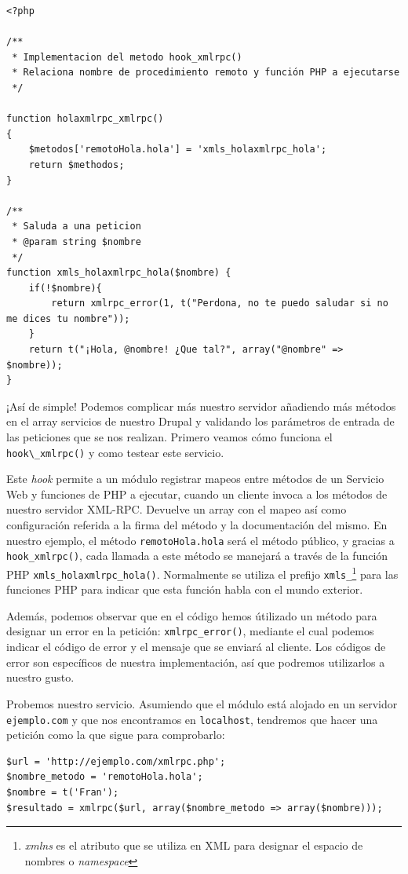 \begin{verbatim}
<?php

/**
 * Implementacion del metodo hook_xmlrpc()
 * Relaciona nombre de procedimiento remoto y función PHP a ejecutarse
 */

function holaxmlrpc_xmlrpc()
{
    $metodos['remotoHola.hola'] = 'xmls_holaxmlrpc_hola';
    return $methodos;
}

/**
 * Saluda a una peticion
 * @param string $nombre
 */
function xmls_holaxmlrpc_hola($nombre) {
    if(!$nombre){
        return xmlrpc_error(1, t("Perdona, no te puedo saludar si no me dices tu nombre"));
    }
    return t("¡Hola, @nombre! ¿Que tal?", array("@nombre" => $nombre));
}
\end{verbatim}

¡Así de simple! Podemos complicar más nuestro servidor añadiendo más métodos en el array servicios de nuestro 
Drupal y validando los parámetros de entrada de las peticiones que se nos realizan. Primero veamos cómo funciona 
el \verb|hook\_xmlrpc()| y como testear este servicio.

Este \textit{hook} permite a un módulo registrar mapeos entre métodos de un Servicio Web y funciones de PHP 
a ejecutar, cuando un cliente invoca a los métodos de nuestro servidor XML-RPC. Devuelve un array con el mapeo así 
como configuración referida a la firma del método y la documentación del mismo. En nuestro ejemplo, el método 
\verb|remotoHola.hola| será el método público, y gracias a \verb|hook_xmlrpc()|, cada llamada a este método se 
manejará a través de la función PHP \verb|xmls_holaxmlrpc_hola()|. Normalmente se utiliza el prefijo \verb|xmls_|\footnote{
\textit{xmlns} es el atributo que se utiliza en XML para designar el espacio de nombres o \textit{namespace}} para las funciones 
PHP para indicar que esta función habla con el mundo exterior.

Además, podemos observar que en el código hemos útilizado un método para designar un error en la petición: 
\verb|xmlrpc_error()|, mediante el cual podemos indicar el código de error y el mensaje que se enviará al cliente. Los 
códigos de error son específicos de nuestra implementación, así que podremos utilizarlos a nuestro gusto.

Probemos nuestro servicio. Asumiendo que el módulo está alojado en un servidor \verb|ejemplo.com| y que nos 
encontramos en \verb|localhost|, tendremos que hacer una petición como la que sigue para comprobarlo:

\begin{verbatim}
$url = 'http://ejemplo.com/xmlrpc.php';
$nombre_metodo = 'remotoHola.hola';
$nombre = t('Fran');
$resultado = xmlrpc($url, array($nombre_metodo => array($nombre)));
\end{verbatim}

